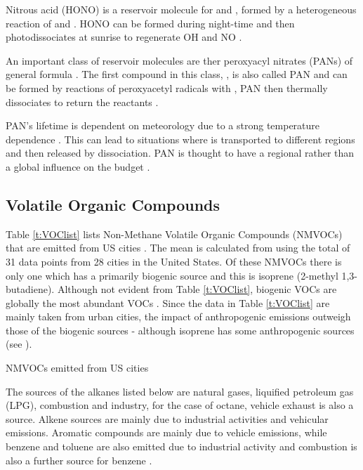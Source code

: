 Nitrous acid (HONO) is a reservoir molecule for  and , formed by a heterogeneous reaction of  and . 
HONO can be formed during night-time and then photodissociates at sunrise to regenerate OH and NO \citep{Seinfeld:2006}.
\begin{reactionlist}
\end{reactionlist}

An important class of reservoir molecules are ther peroxyacyl nitrates (PANs) of general formula . 
The first compound in this class, , is also called PAN and can be formed by reactions of peroxyacetyl radicals with , PAN then thermally dissociates to return the reactants \citep{Kleinman:2005}.
\begin{reactionlist}
\end{reactionlist}
PAN's lifetime is dependent on meteorology due to a strong temperature dependence \citep{Moxim:1996}. 
This can lead to situations where  is transported to different regions and then released by dissociation. 
PAN is thought to have a regional rather than a global influence on the  budget \citep{Moxim:1996}.

\subsection{Volatile Organic Compounds}
Table \ref{t:VOClist} lists Non-Methane Volatile Organic Compounds (NMVOCs) that are emitted from US cities \citep{Baker:2008}. 
The mean is calculated from \citep{Baker:2008} using the total of 31 data points from 28 cities in the United States. 
Of these NMVOCs there is only one which has a primarily biogenic source and this is isoprene (2-methyl 1,3-butadiene). 
Although not evident from Table \ref{t:VOClist}, biogenic VOCs are globally the most abundant VOCs \citep{Goldstein:2007}. 
Since the data in Table \ref{t:VOClist} are mainly taken from urban cities, the impact of anthropogenic emissions outweigh those of the biogenic sources \citep{Baker:2008} - although isoprene has some anthropogenic sources (see \citep{Borbon:2003}). 
\begin{table}
    \caption{NMVOCs emitted from US cities \citep{Baker:2008}} 
    \label{t:VOClist}
\end{table}

The sources of the alkanes listed below are natural gases, liquified petroleum gas (LPG), combustion and industry, for the case of octane, vehicle exhaust is also a source. 
Alkene sources are mainly due to industrial activities and vehicular emissions. 
Aromatic compounds are mainly due to vehicle emissions, while benzene and toluene are also emitted due to industrial activity and combustion is also a further source for benzene \citep{Arsene:2009}.

